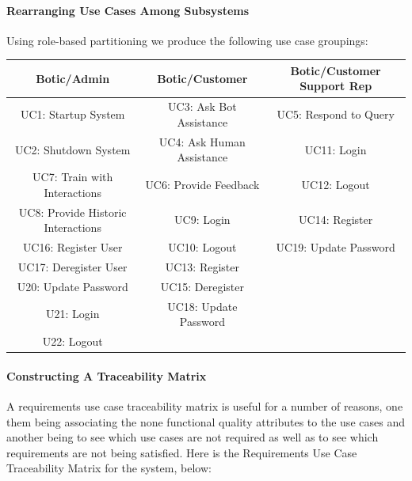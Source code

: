 \documentclass[11pt]{article}
\begin{document}
\paragraph{Rearranging Use Cases Among Subsystems}

Using role-based partitioning we produce the following use case groupings:

\begin{center}
	\begin{tabular}{|c|c|c|}
	\hline
	Botic/Admin & Botic/Customer & Botic/Customer Support Rep \\
	\hline
	UC1: Startup System & UC3: Ask Bot Assistance & UC5: Respond to Query \\
	\hline
	UC2: Shutdown System & UC4: Ask Human Assistance & UC11: Login\\
	\hline
	UC7: Train with Interactions & UC6: Provide Feedback & UC12: Logout\\
	\hline
	UC8: Provide Historic Interactions & UC9: Login & UC14: Register  \\
	\hline
	UC16: Register User & UC10: Logout & UC19: Update Password \\
	\hline
	UC17: Deregister User & UC13: Register &  \\
	\hline
	U20: Update Password  & UC15: Deregister & \\
	\hline
	U21: Login & UC18: Update Password & \\
	\hline
	U22: Logout & & \\
	\hline
	\end{tabular}
\end{center}

\paragraph{Constructing A Traceability Matrix}

A requirements use case traceability matrix is useful for a number of reasons, one them being associating the none functional quality attributes to the use cases and another being to see which use cases are not required as well as to see which requirements are not being satisfied. Here is the Requirements Use Case Traceability Matrix for the system, below:
\end{document}
